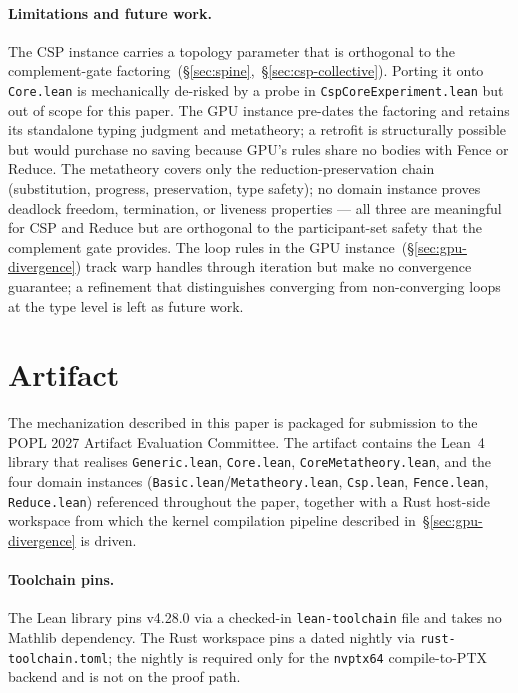 \documentclass[acmsmall,screen,review,anonymous,nonacm]{acmart}
\begin{document}
\paragraph{Limitations and future work.}
The CSP instance carries a topology parameter that is orthogonal to the complement-gate factoring~(\S\ref{sec:spine},~\S\ref{sec:csp-collective}). Porting it onto \texttt{Core.lean} is mechanically de-risked by a probe in \texttt{CspCoreExperiment.lean} but out of scope for this paper. The GPU instance pre-dates the factoring and retains its standalone typing judgment and metatheory; a retrofit is structurally possible but would purchase no saving because GPU's rules share no bodies with Fence or Reduce. The metatheory covers only the reduction-preservation chain (substitution, progress, preservation, type safety); no domain instance proves deadlock freedom, termination, or liveness properties --- all three are meaningful for CSP and Reduce but are orthogonal to the participant-set safety that the complement gate provides. The loop rules in the GPU instance~(\S\ref{sec:gpu-divergence}) track warp handles through iteration but make no convergence guarantee; a refinement that distinguishes converging from non-converging loops at the type level is left as future work.


\section{Artifact}\label{sec:artifact}

The mechanization described in this paper is packaged for submission to the POPL 2027 Artifact Evaluation Committee. The artifact contains the Lean~4 library that realises \texttt{Generic.lean}, \texttt{Core.lean}, \texttt{CoreMetatheory.lean}, and the four domain instances (\texttt{Basic.lean}/\texttt{Metatheory.lean}, \texttt{Csp.lean}, \texttt{Fence.lean}, \texttt{Reduce.lean}) referenced throughout the paper, together with a Rust host-side workspace from which the kernel compilation pipeline described in~\S\ref{sec:gpu-divergence} is driven.

\paragraph{Toolchain pins.}
The Lean library pins v4.28.0 via a checked-in \texttt{lean-toolchain} file and takes no Mathlib dependency. The Rust workspace pins a dated nightly via \texttt{rust-toolchain.toml}; the nightly is required only for the \texttt{nvptx64} compile-to-PTX backend and is not on the proof path.
\end{document}
